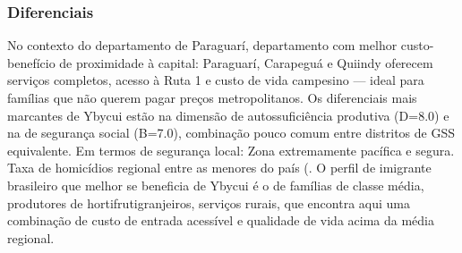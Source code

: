 \subsubsection*{Diferenciais}\label{dif-ybycui-0916}
No contexto do departamento de Paraguarí, departamento com melhor custo-benefício de proximidade à capital: Paraguarí, Carapeguá e Quiindy oferecem serviços completos, acesso à Ruta 1 e custo de vida campesino — ideal para famílias que não querem pagar preços metropolitanos. Os diferenciais mais marcantes de Ybycui estão na dimensão de autossuficiência produtiva (D=8.0) e na de segurança social (B=7.0), combinação pouco comum entre distritos de GSS equivalente. Em termos de segurança local: Zona extremamente pacífica e segura. Taxa de homicídios regional entre as menores do país (. O perfil de imigrante brasileiro que melhor se beneficia de Ybycui é o de famílias de classe média, produtores de hortifrutigranjeiros, serviços rurais, que encontra aqui uma combinação de custo de entrada acessível e qualidade de vida acima da média regional.
